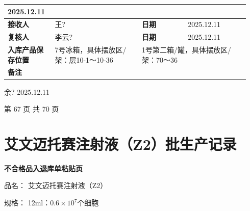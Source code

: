 \documentclass[UTF8,10pt,a4paper,fontset=fandol]{ctexart}
\newcommand{\fieldvalue}[1]{#1}
\newcommand{\handwritten}[1]{#1}
\begin{document}
\begin{tabular}{|p{0.18\linewidth}|p{0.34\linewidth}|p{0.18\linewidth}|p{0.24\linewidth}|}
\fieldvalue{\handwritten{2025.12.11}}
\\ \hline
\textbf{接收人}
&
\fieldvalue{\handwritten{王?}}
&
\textbf{日期}
&
\fieldvalue{\handwritten{2025.12.11}}
\\ \hline
\textbf{复核人}
&
\fieldvalue{\handwritten{李云?}}
&
\textbf{日期}
&
\fieldvalue{\handwritten{2025.12.11}}
\\ \hline
\textbf{入库产品保存位置}
&
\fieldvalue{\handwritten{7号冰箱，具体摆放区/架：层10-1～10-36}}
&
\multicolumn{2}{l|}{%
\fieldvalue{\handwritten{1号第二箱/罐，具体摆放区/架：70～36}}
}
\\ \hline
\textbf{备注}
&
\multicolumn{3}{l|}{}
\\ \hline
\end{tabular}

\vspace{1.5em}

\fieldvalue{\handwritten{余? 2025.12.11}}

\vfill
\begin{center}
第 67 页 共 70 页
\end{center}

\newpage

\section*{艾文迈托赛注射液（Z2）批生产记录}

\textbf{不合格品入退库单粘贴页}

品名：
\fieldvalue{艾文迈托赛注射液（Z2）}

规格：
\fieldvalue{12ml：$0.6\times10^{7}$个细胞}
\end{document}

